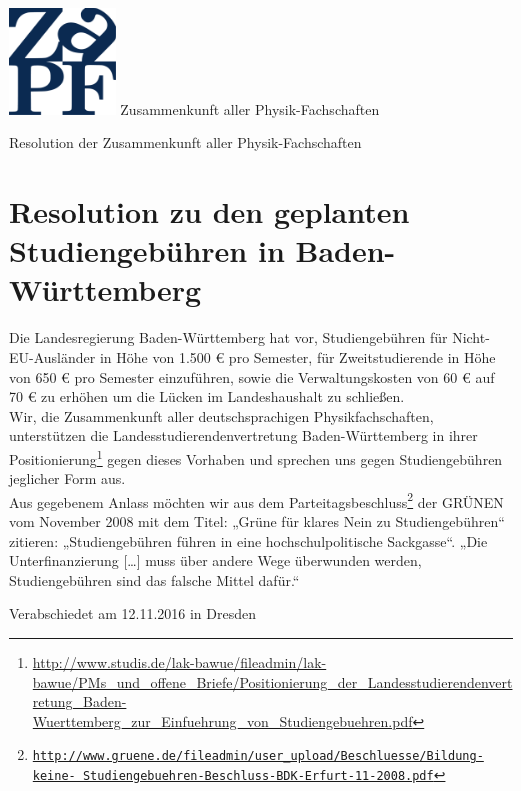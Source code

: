 \documentclass[DIV=calc]{scrartcl}
\begin{document}
\hspace{0.87\textwidth}
\begin{minipage}{120pt}
\vspace{-1.8cm}
\includegraphics[width=80pt]{logo.pdf}
\centering
\small Zusammenkunft aller Physik-Fachschaften
\end{minipage}
\begin{center}
\huge{Resolution der Zusammenkunft aller Physik-Fachschaften} \\
\normalsize
\end{center}

\vspace{1cm}
\section*{Resolution zu den geplanten Studiengebühren in Baden-Württemberg}

Die Landesregierung Baden-Württemberg hat vor, Studiengebühren für Nicht-EU-Ausländer in Höhe von 1.500 € pro Semester, für Zweitstudierende in Höhe von 650 € pro Semester einzuführen, sowie die Verwaltungskosten von 60 € auf 70 € zu erhöhen um die Lücken im Landeshaushalt zu schließen. \\
Wir, die Zusammenkunft aller deutschsprachigen Physikfachschaften, unterstützen die Landesstudierendenvertretung Baden-Württemberg in ihrer Positionierung\footnote{\url{http://www.studis.de/lak-bawue/fileadmin/lak-bawue/PMs_und_offene_Briefe/Positionierung_der_Landesstudierendenvertretung_Baden-Wuerttemberg_zur_Einfuehrung_von_Studiengebuehren.pdf}} gegen dieses Vorhaben und sprechen uns gegen Studiengebühren jeglicher Form aus.\\
Aus gegebenem Anlass möchten wir aus dem Parteitagsbeschluss\footnote{\href{http://www.gruene.de/fileadmin/user_upload/Beschluesse/Bildung-keine-Studiengebuehren-Beschluss-BDK-Erfurt-11-2008.pdf}{\texttt{http://www.gruene.de/fileadmin/user\_upload/Beschluesse/Bildung-keine- Studiengebuehren-Beschluss-BDK-Erfurt-11-2008.pdf}}} der GRÜNEN vom November 2008 mit dem Titel: „Grüne für klares Nein zu Studiengebühren“ zitieren: „Studiengebühren führen in eine hochschulpolitische Sackgasse“. „Die Unterfinanzierung […] muss über andere Wege überwunden werden, Studiengebühren sind das falsche Mittel dafür.“\\





\vfill
\begin{flushright}
Verabschiedet am 12.11.2016 in Dresden
\end{flushright}
\end{document}
